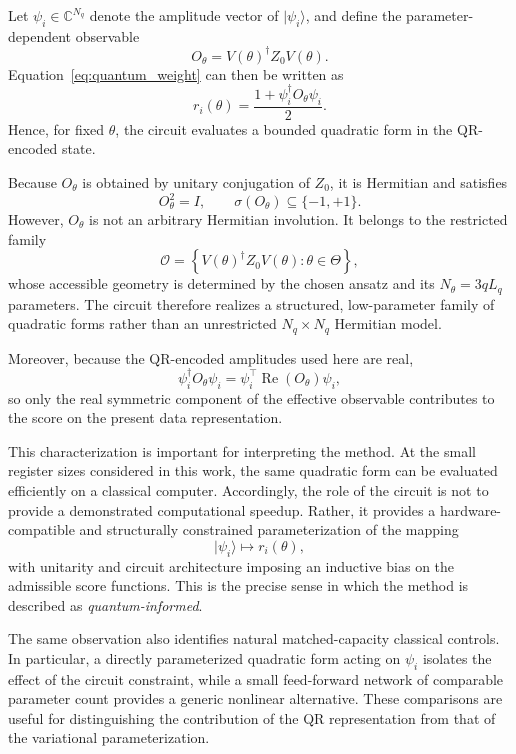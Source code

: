 \documentclass[11pt,a4paper]{article}
\begin{document}
Let \(\psi_i\in\mathbb{C}^{N_q}\) denote the amplitude vector of
\(\lvert\psi_i\rangle\), and define the parameter-dependent observable
\begin{equation}
O_\theta
=
V(\theta)^\dagger
Z_0
V(\theta).
\label{eq:effective_observable}
\end{equation}
Equation~\eqref{eq:quantum_weight} can then be written as
\begin{equation}
r_i(\theta)
=
\frac{1+\psi_i^\dagger O_\theta\psi_i}{2}.
\label{eq:quadratic_weight}
\end{equation}
Hence, for fixed \(\theta\), the circuit evaluates a bounded quadratic form in
the QR-encoded state.

Because \(O_\theta\) is obtained by unitary conjugation of \(Z_0\), it is
Hermitian and satisfies
\[
O_\theta^2=I,
\qquad
\sigma(O_\theta)\subseteq\{-1,+1\}.
\]
However, \(O_\theta\) is not an arbitrary Hermitian involution. It belongs to
the restricted family
\[
\mathcal{O}
=
\left\{
V(\theta)^\dagger Z_0V(\theta):
\theta\in\Theta
\right\},
\]
whose accessible geometry is determined by the chosen ansatz and its
\(N_\theta=3qL_q\) parameters. The circuit therefore realizes a structured,
low-parameter family of quadratic forms rather than an unrestricted
\(N_q\times N_q\) Hermitian model.

Moreover, because the QR-encoded amplitudes used here are real,
\[
\psi_i^\dagger O_\theta\psi_i
=
\psi_i^\top
\operatorname{Re}(O_\theta)
\psi_i,
\]
so only the real symmetric component of the effective observable contributes
to the score on the present data representation.

This characterization is important for interpreting the method. At the small
register sizes considered in this work, the same quadratic form can be
evaluated efficiently on a classical computer. Accordingly, the role of the
circuit is not to provide a demonstrated computational speedup. Rather, it
provides a hardware-compatible and structurally constrained parameterization
of the mapping
\[
\lvert\psi_i\rangle
\longmapsto
r_i(\theta),
\]
with unitarity and circuit architecture imposing an inductive bias on the
admissible score functions. This is the precise sense in which the method is
described as \emph{quantum-informed}.

The same observation also identifies natural matched-capacity classical
controls. In particular, a directly parameterized quadratic form acting on
\(\psi_i\) isolates the effect of the circuit constraint, while a small
feed-forward network of comparable parameter count provides a generic
nonlinear alternative. These comparisons are useful for distinguishing the
contribution of the QR representation from that of the variational
parameterization.
\end{document}

